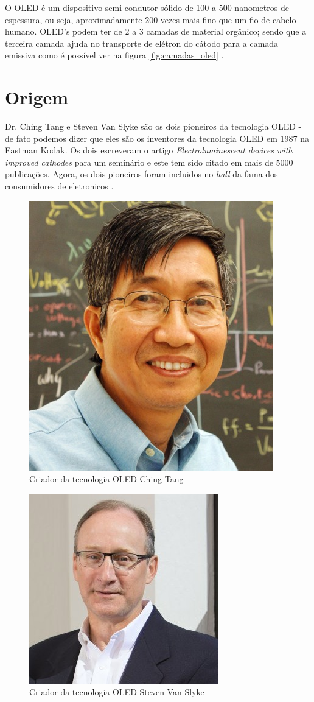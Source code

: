 O OLED é um dispositivo semi-condutor sólido de 100 a 500 nanometros de espessura, ou seja, aproximadamente 200 vezes mais fino que um fio de cabelo humano. OLED's podem ter de 2 a 3 camadas de material orgânico; sendo que a terceira camada ajuda no transporte de elétron do cátodo para a camada emissiva como é possível ver na figura \ref{fig:camadas_oled} \cite{HSWOLED}.\\

\section{Origem}
\label{sec:origem}

Dr. Ching Tang e Steven Van Slyke são os dois pioneiros da tecnologia OLED - de fato podemos dizer que eles são os inventores da tecnologia OLED em 1987 na Eastman Kodak. Os dois escreveram o artigo \textit{Electroluminescent devices with improved cathodes} para um seminário e este tem sido citado em mais de 5000 publicações. Agora, os dois pioneiros foram incluidos no \textit{hall} da fama dos consumidores de eletronicos \cite{OLEDPioneers}. \\

\begin{figure}[!ht]
  \centering
  \includegraphics[width=.40\textwidth]{./figuras/ching_tang} 
  \caption{Criador da tecnologia OLED Ching Tang}
  \label{fig:ching_tang} 
\end{figure}

\begin{figure}[!ht]
  \centering
  \includegraphics[width=.40\textwidth]{./figuras/steven_slyke} 
  \caption{Criador da tecnologia OLED Steven Van Slyke}
  \label{fig:steven_slyke} 
\end{figure}

